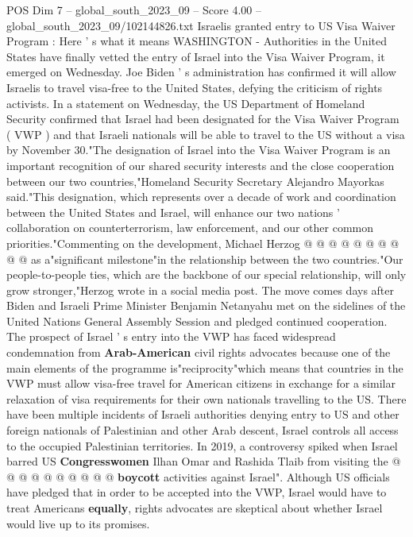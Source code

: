 \begin{textsample}{POS Dim 7 – global\_south\_2023\_09 – Score 4.00 – global\_south\_2023\_09/102144826.txt}  \label{ex:f7_pos_122}
Israelis granted entry to US Visa Waiver Program : Here ' s what it means WASHINGTON - Authorities in the United States have finally vetted the entry of Israel into the Visa Waiver Program, it emerged on Wednesday.
Joe Biden ' s administration has confirmed it will allow Israelis to travel visa-free to the United States, defying the criticism of rights activists.
In a statement on Wednesday, the US Department of Homeland Security confirmed that Israel had been designated for the Visa Waiver Program ( VWP ) and that Israeli nationals will be able to travel to the US without a visa by November 30."The designation of Israel into the Visa Waiver Program is an important recognition of our shared security interests and the close cooperation between our two countries,"Homeland Security Secretary Alejandro Mayorkas said."This designation, which represents over a decade of work and coordination between the United States and Israel, will enhance our two nations ' collaboration on counterterrorism, law enforcement, and our other common priorities."Commenting on the development, Michael Herzog @ @ @ @ @ @ @ @ @ @ as a"significant milestone"in the relationship between the two countries."Our people-to-people ties, which are the backbone of our special relationship, will only grow stronger,"Herzog wrote in a social media post.
The move comes days after Biden and Israeli Prime Minister Benjamin Netanyahu met on the sidelines of the United Nations General Assembly Session and pledged continued cooperation.
The prospect of Israel ' s entry into the VWP has faced widespread condemnation from \textbf{Arab-American} civil rights advocates because one of the main elements of the programme is"reciprocity"which means that countries in the VWP must allow visa-free travel for American citizens in exchange for a similar relaxation of visa requirements for their own nationals travelling to the US.
There have been multiple incidents of Israeli authorities denying entry to US and other foreign nationals of Palestinian and other Arab descent, Israel controls all access to the occupied Palestinian territories.
In 2019, a controversy spiked when Israel barred US \textbf{Congresswomen} Ilhan Omar and Rashida Tlaib from visiting the @ @ @ @ @ @ @ @ @ @ \textbf{boycott} activities against Israel".
Although US officials have pledged that in order to be accepted into the VWP, Israel would have to treat Americans \textbf{equally}, rights advocates are skeptical about whether Israel would live up to its promises.

\end{textsample}
